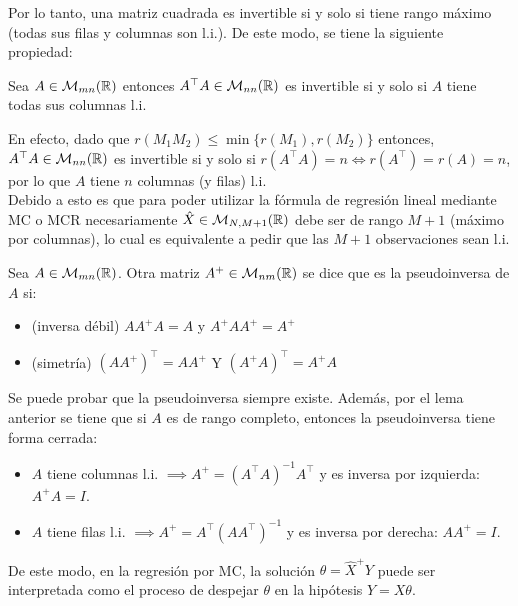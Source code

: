 Por lo tanto, una matriz cuadrada es invertible si y solo si tiene rango máximo (todas sus filas y columnas son l.i.). De este modo, se tiene la siguiente propiedad:

\begin{lemma}
	Sea $A\in\mathcal{M}_{mn}(\mathbb{R})$ entonces $A^\top A \in\mathcal{M}_{nn}(\mathbb{R})$ es invertible si y solo si $A$ tiene todas sus columnas l.i.
\end{lemma}

En efecto, dado que $r(M_1M_2)\leq\min\{r(M_1),r(M_2)\}$ entonces, $A^\top A \in\mathcal{M}_{nn}(\mathbb{R})$ es invertible si y solo si $r(A^\top A)=n\iff r(A^\top )=r(A)=n$, por lo que $A$ tiene $n$ columnas (y filas) l.i.\\

Debido a esto es que para poder utilizar la fórmula de regresión lineal mediante MC o MCR necesariamente $\hat{X} \in\mathcal{M}_{N,M+1}(\mathbb{R})$ debe ser de rango $M+1$ (máximo por columnas), lo cual es equivalente a pedir que las $M+1$ observaciones sean l.i.\\

\begin{definition} Sea $A\in\mathcal{M}_{mn}(\mathbb{R})$. Otra matriz $A^+\in\mathcal{M}_{nm}(\mathbb{R})$ se dice que es la pseudoinversa de $A$ si:

\begin{itemize}
	\item (inversa débil) $AA^+A=A$ y $A^+AA^+=A^+$
	\item (simetría) $(AA^+)^\top  = AA^+$ Y $(A^+A)^\top  = A^+A$
\end{itemize}
	
\end{definition}

Se puede probar que la pseudoinversa siempre existe. Además, por el lema anterior se tiene que si $A$ es de rango completo, entonces la pseudoinversa tiene forma cerrada:

\begin{itemize}
	\item $A$ tiene columnas l.i. $\implies A^+=(A^\top A)^{-1}A^\top $ y es inversa por izquierda: $A^+A=I$.
	\item $A$ tiene filas l.i. $\implies A^+=A^\top (AA^\top )^{-1}$ y es inversa por derecha: $AA^+=I$.
\end{itemize}

De este modo, en la regresión por MC, la solución $\theta=\hat{X}^+Y$ puede ser interpretada como el proceso de despejar $\theta$ en la hipótesis $Y=X\theta$.

